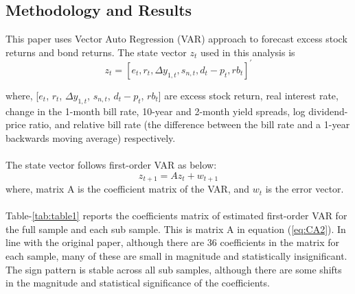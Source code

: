 \documentclass[11pt]{article}
\begin{document}
\subsection{Methodology and Results}
This paper uses Vector Auto Regression (VAR) approach to forecast excess stock returns and bond returns. The state vector $z_t$ used in this analysis is
\begin{equation} \label{eq:CA1}
z_{t}=\left[e_{t}, r_{t}, \Delta y_{1, t}, s_{n, t}, d_{t}-p_{t}, r b_{t}\right]^{\prime}
\end{equation}

where, [$e_{t}$, $r_{t}$, $\Delta y_{1, t}$, $s_{n, t}$, $d_{t}-p_{t}$, $rb_{t}$] are excess stock return, real interest rate, change in the 1-month bill rate, 10-year and 2-month yield spreads, log dividend-price ratio, and relative bill rate (the difference between the bill rate and a 1-year backwards moving average) respectively.

\paragraph{} The state vector follows first-order VAR as below:
\begin{equation} \label{eq:CA2}
z_{t+1}=A z_{t}+w_{t+1}
\end{equation}
where, matrix A is the coefficient matrix of the VAR, and $w_{t}$ is the error vector.

\paragraph{} Table-\ref{tab:table1} reports the coefficients matrix of estimated first-order VAR for the
full sample and each sub sample. This is matrix A in equation (\ref{eq:CA2}).
In line with the original paper, although there are 36 coefficients in the matrix for each sample, many of these are small in magnitude and statistically insignificant. The sign pattern is stable across all sub samples, although there are some shifts in the magnitude and statistical significance of the coefficients.
\end{document}
